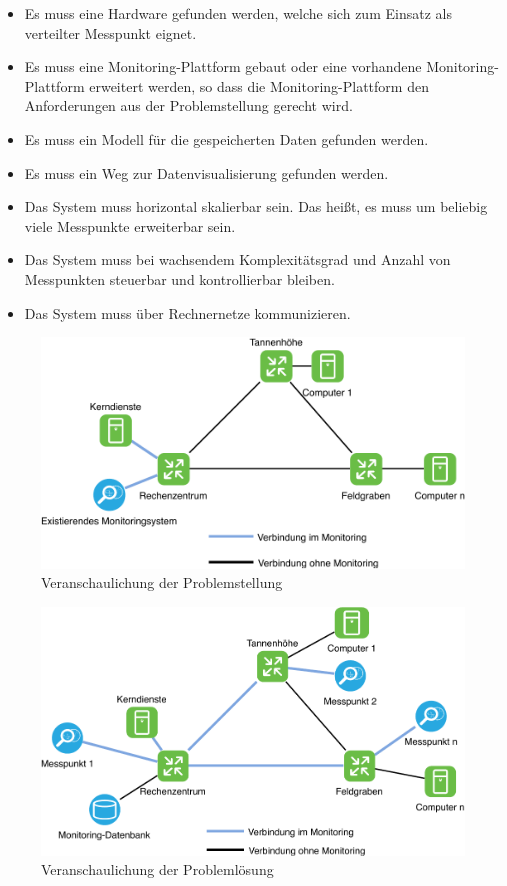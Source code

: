 \documentclass[titlepage]{report}
\begin{document}
\begin{itemize}
    \item Es muss eine Hardware gefunden werden, welche sich zum Einsatz
          als verteilter Messpunkt eignet.
    \item Es muss eine Monitoring\hyp{}Plattform gebaut oder eine
          vorhandene Monitoring\hyp{}Plattform erweitert werden, so dass die
          Monitoring\hyp{}Plattform den Anforderungen aus der
          Problemstellung gerecht wird.
    \item Es muss ein Modell für die gespeicherten Daten gefunden
          werden.
    \item Es muss ein Weg zur Datenvisualisierung gefunden werden.
    \item Das System muss horizontal skalierbar sein. Das heißt, es
          muss um beliebig viele Messpunkte erweiterbar sein.
    \item Das System muss bei wachsendem Komplexitätsgrad und Anzahl von
          Messpunkten steuerbar und kontrollierbar bleiben.
    \item Das System muss über Rechnernetze kommunizieren.
\end{itemize}

\begin{figure}[H]
    \centering
    \includegraphics[width=1.0\textwidth]{figures/problemstellung.pdf}
    \caption{Veranschaulichung der Problemstellung}\label{fig:problemstellung}
\end{figure}
\begin{figure}[H]
    \centering
    \includegraphics[width=1.0\textwidth]{figures/problemloesung.pdf}
    \caption{Veranschaulichung der Problemlösung}\label{fig:problemloesung}
\end{figure}
\end{document}
